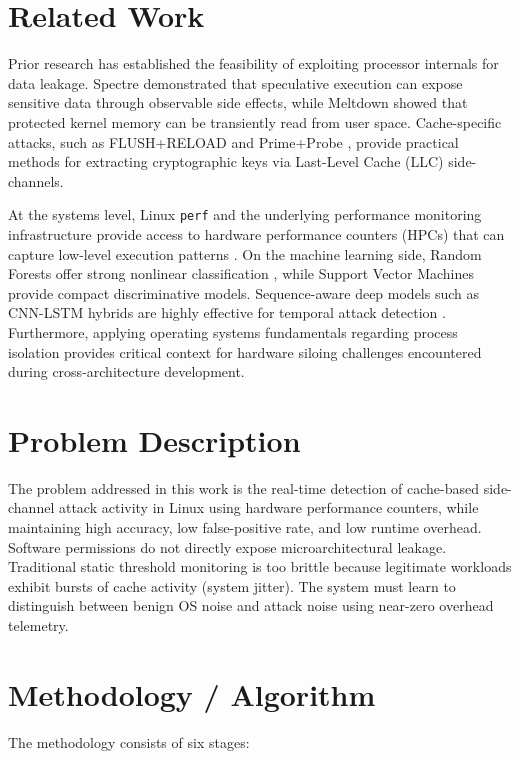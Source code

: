 \documentclass[conference]{IEEEtran}
\begin{document}
\section{Related Work}
Prior research has established the feasibility of exploiting processor internals for data leakage. Spectre \cite{spectre} demonstrated that speculative execution can expose sensitive data through observable side effects, while Meltdown \cite{meltdown} showed that protected kernel memory can be transiently read from user space. Cache-specific attacks, such as FLUSH+RELOAD \cite{yarom} and Prime+Probe \cite{liu}, provide practical methods for extracting cryptographic keys via Last-Level Cache (LLC) side-channels.

At the systems level, Linux \texttt{perf} and the underlying performance monitoring infrastructure provide access to hardware performance counters (HPCs) that can capture low-level execution patterns \cite{perfwiki,intelsdm}. On the machine learning side, Random Forests offer strong nonlinear classification \cite{musleh}, while Support Vector Machines provide compact discriminative models. Sequence-aware deep models such as CNN-LSTM hybrids are highly effective for temporal attack detection \cite{surveydl}. Furthermore, applying operating systems fundamentals \cite{tanenbaum} regarding process isolation provides critical context for hardware siloing challenges encountered during cross-architecture development.

\section{Problem Description}
The problem addressed in this work is the real-time detection of cache-based side-channel attack activity in Linux using hardware performance counters, while maintaining high accuracy, low false-positive rate, and low runtime overhead. Software permissions do not directly expose microarchitectural leakage. Traditional static threshold monitoring is too brittle because legitimate workloads exhibit bursts of cache activity (system jitter). The system must learn to distinguish between benign OS noise and attack noise using near-zero overhead telemetry.

\section{Methodology / Algorithm}
The methodology consists of six stages:
\end{document}
